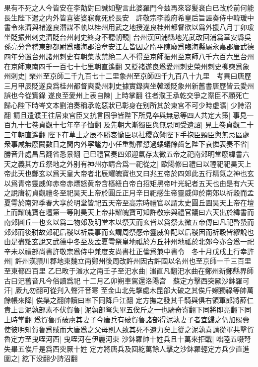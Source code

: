 果有不死之人今皆安在李勣對曰誠如聖言此婆羅門今兹再來容髪衰白已改於前何能長生陛下遣之内外皆喜娑婆寐竟死於長安　許敬宗李義府希皇后旨誣奏侍中韓瑗中書令來濟與禇遂良潛謀不軌以桂州用武之地授遂良桂州都督欲以爲外援八月丁卯瑗坐貶振州刺史濟貶台州刺史終身不聽朝覲|{
	台州漢回浦縣地光武改回浦爲章安縣吳孫亮分會稽東部都尉爲臨海郡治章安江左皆因之隋平陳廢爲臨海縣屬永嘉郡唐武德四年分置台州諸州刺史有朝集故禁絶二人不得至京師振州至京師八千六百六里台州在京師東南四千一百七十七里朝直遙翻}
又貶禇遂良爲愛州刺史榮州刺史柳奭爲象州刺史|{
	榮州至京師二千九百七十二里象州至京師四千九百八十九里　考異曰唐歷三月甲辰貶遂良爲桂州都督奭愛州刺史據實錄奭坐韓瑗貶象州新舊書唐歷皆云愛州誤也今從實錄}
遂良至愛州上表自陳|{
	上時掌翻}
往者濮王承乾交爭之際臣不顧死亡歸心陛下時岑文本劉洎奏稱承乾惡狀已彰身在别所其於東宮不可少時虛曠|{
	少詩沼翻}
請且遣濮王往居東宫臣又抗言固爭皆陛下所見卒與無忌等四人共定大策|{
	事見一百九十七卷貞觀十七年卒子恤翻}
及先朝大漸獨臣與無忌同受遺詔|{
	見上卷貞觀二十三年朝直遙翻}
陛下在草土之辰不勝哀慟臣以社稷寛譬陛下手抱臣頸臣與無忌區處衆事咸無廢闕數日之間内外寜謐力小任重動罹愆過螻蟻餘齒乞陛下哀憐表奏不省|{
	勝音升處昌呂翻省悉景翻}
己巳禮官奏四郊迎氣存太微五帝之祀南郊明堂廢緯書六天之義其方丘祭地之外别有神州亦請合爲一祀從之|{
	歐陽修曰禮曰以禋祀祀昊天上帝此天也鄭玄以爲天皇大帝者北辰耀魄寶也又曰兆五帝於四郊此五行精氣之神也玄以爲青帝靈威仰赤帝赤熛怒黄帝含樞紐白帝白招矩黑帝叶光紀者五天也由是有六天之說唐初貞觀禮冬至祀昊天上帝於圓丘正月辛日祀感生帝靈威仰於南郊以祈穀而孟夏雩於南郊季春大享於明堂皆祀五天帝至高宗時禮官以謂太史圓丘圖昊天上帝在壇上而耀魄寶在壇第一等則昊天上帝非耀魄寶可知許敬宗與禮官議曰六天出於緯書而南郊圓丘一也玄以爲二物郊及明堂本以祭天而玄皆以爲祭太微五帝傳曰凡祀啓蟄而郊郊而後耕故郊祀后稷以祈農事而玄謂周祭感帝靈威仰配以后稷因而祈穀皆繆說也由是盡黜玄說又武德中冬至及孟夏雩祭皇地祗於方丘神州地祗於北郊今亦合爲一祀}
辛未以禮部尚書許敬宗爲侍中兼度支尚書杜正倫爲兼中書令　冬十月戊戌上行幸許州|{
	許州漢頴川郡地東魏立南鄭州後周改許州因古許國以名州也至京師一千三百里至東都四百里}
乙巳畋于滍水之南壬子至汜水曲|{
	滍直凡翻汜水曲在鄭州新鄭縣界師古曰汜舊音凡今俗讀爲祀}
十二月乙卯朔車駕還洛陽宫　蘇定方擊西突厥沙鉢羅可汗|{
	厥九勿翻可從刋入聲汗音寒}
至金山北先擊處木昆部大破之其俟斤嬾獨祿等帥萬餘帳來降|{
	俟渠之翻帥讀曰率下同降戶江翻}
定方撫之發其千騎與俱右領軍郎將薛仁貴上言泥孰部素不伏賀魯|{
	泥孰部弩失畢五俟斤之一也騎奇寄翻下同將即亮翻下同上時掌翻}
爲賀魯所破虜其妻子今唐兵有破賀魯諸部得泥孰妻子者宜歸之仍加賜賚使彼明知賀魯爲賊而大唐爲之父母則人致其死不遺力矣上從之泥孰喜請從軍共擊賀魯定方至曳咥河西|{
	曳咥河在伊麗河東}
沙鉢羅帥十姓兵且十萬來拒戰|{
	咄陸五啜弩失畢五俟斤是爲西突厥十姓}
定方將唐兵及回紇萬餘人擊之沙鉢羅輕定方兵少直進圍之|{
	紇下没翻少詩沼翻}
